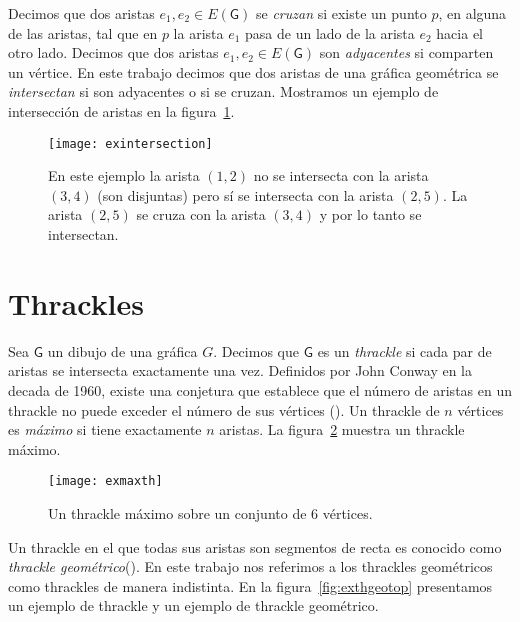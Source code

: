 Decimos que dos aristas $e_1,e_2 \in E(\mathsf{G})$ se \emph{cruzan} si existe un punto $p$,
en alguna de las aristas, tal que en $p$ la arista $e_1$ pasa de un lado de la arista
$e_2$ hacia el otro lado. Decimos que dos aristas $e_1, e_2 \in E(\mathsf{G})$ son
\emph{adyacentes} si comparten un vértice.
En este trabajo decimos que dos aristas de una gráfica geométrica se \emph{intersectan}
si son adyacentes o si se cruzan.
Mostramos un ejemplo de intersección de aristas en la figura~\ref{fig:exintersection}.
\begin{figure}[htpb]
  \centering
  \texttt{[image: exintersection]}
  \caption{En este ejemplo la arista $(1,2)$ no se intersecta con la arista $(3,4)$
  (son disjuntas) pero sí se intersecta con la arista $(2,5)$.
  La arista $(2,5)$ se cruza con la arista $(3,4)$ y por lo tanto se intersectan.}
  \label{fig:exintersection}
\end{figure}

\section{Thrackles}
Sea $\mathsf{G}$ un dibujo de una gráfica $G$. Decimos que $\mathsf{G}$ es un
\emph{thrackle} si cada par de aristas se intersecta exactamente una vez.
Definidos por John Conway en la decada de 1960, existe una conjetura
que establece que el número de aristas en un thrackle no puede
exceder el número de sus vértices (\cite{brass2006research}).
Un thrackle de $n$ vértices es \emph{máximo} si tiene exactamente
$n$ aristas. La figura~\ref{fig:exmaxth} muestra un thrackle máximo.

\begin{figure}[htpb]
  \centering
  \texttt{[image: exmaxth]}
  \caption{Un thrackle máximo sobre un conjunto de 6 vértices.}
  \label{fig:exmaxth}
\end{figure}

Un thrackle en el que todas sus aristas son segmentos de recta es conocido como
\emph{thrackle geométrico}(\cite{Schaefer2018}). En este trabajo nos referimos a los thrackles geométricos
como thrackles de manera indistinta. En la figura~\ref{fig:exthgeotop} presentamos un ejemplo de thrackle
y un ejemplo de thrackle geométrico.

